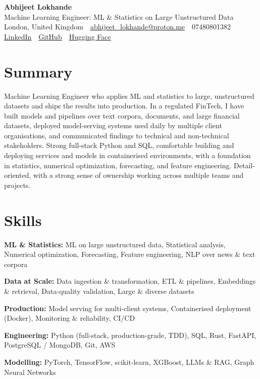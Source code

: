 \documentclass[10pt,a4paper]{article}
\newcommand{\sep}{\,\textcolor{accent!60}{\textbar}\,}
\begin{document}
\begin{center}
  {\fontsize{24}{26}\selectfont\bfseries Abhijeet Lokhande}\\[3pt]
  {\color{accent}\large Machine Learning Engineer: ML \& Statistics on Large Unstructured Data}\\[5pt]
  {\small
    London, United Kingdom \sep
    \href{mailto:abhijeet_lokhande@proton.me}{abhijeet\_lokhande@proton.me} \sep
    07480801382 \\[2pt]
    \href{https://www.linkedin.com/in/ablds/}{LinkedIn} \sep
    \href{https://github.com/abhijeetscode}{GitHub} \sep
    \href{https://huggingface.co/ab-ai}{Hugging Face}
  }
\end{center}
\vspace{2pt}

\section{Summary}
Machine Learning Engineer who applies ML and statistics to large, unstructured datasets and ships the results into production. In a regulated FinTech, I have built models and pipelines over text corpora, documents, and large financial datasets, deployed model-serving systems used daily by multiple client organisations, and communicated findings to technical and non-technical stakeholders. Strong full-stack Python and SQL, comfortable building and deploying services and models in containerised environments, with a foundation in statistics, numerical optimization, forecasting, and feature engineering. Detail-oriented, with a strong sense of ownership working across multiple teams and projects.

\section{Skills}
\begin{tight}
  \item[\textcolor{accent}{\small$\bullet$}] \textbf{ML \& Statistics:} ML on large unstructured data, Statistical analysis, Numerical optimization, Forecasting, Feature engineering, NLP over news \& text corpora
  \item[\textcolor{accent}{\small$\bullet$}] \textbf{Data at Scale:} Data ingestion \& transformation, ETL \& pipelines, Embeddings \& retrieval, Data-quality validation, Large \& diverse datasets
  \item[\textcolor{accent}{\small$\bullet$}] \textbf{Production:} Model serving for multi-client systems, Containerised deployment (Docker), Monitoring \& reliability, CI/CD
  \item[\textcolor{accent}{\small$\bullet$}] \textbf{Engineering:} Python (full-stack, production-grade, TDD), SQL, Rust, FastAPI, PostgreSQL / MongoDB, Git, AWS
  \item[\textcolor{accent}{\small$\bullet$}] \textbf{Modelling:} PyTorch, TensorFlow, scikit-learn, XGBoost, LLMs \& RAG, Graph Neural Networks
\end{tight}
\end{document}
